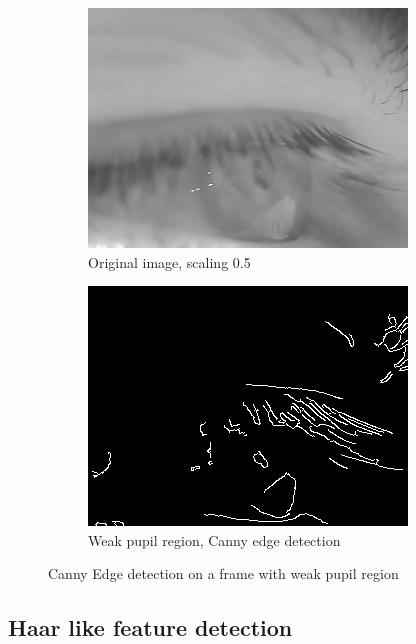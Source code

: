 \begin{figure}[ht]
    \centering
    \begin{subfigure}{.5\textwidth}
      \centering
      \includegraphics[width=.9\linewidth]{plots/orig_canny_eyelids.png}
      \caption{Original image, scaling 0.5}
      \label{fig:orig_canny_lids}
    \end{subfigure}%
    \begin{subfigure}{.5\textwidth}
      \centering
      \includegraphics[width=.9\linewidth]{plots/canny_eyelids.png}
      \caption{Weak pupil region, Canny edge detection}
      \label{fig:canny_eyelid}
    \end{subfigure}
    \caption{Canny Edge detection on a frame with weak pupil region}
    \label{fig:canny_eyelid}
\end{figure}

\subsection{Haar like feature detection }
\label{subsec:haar}
